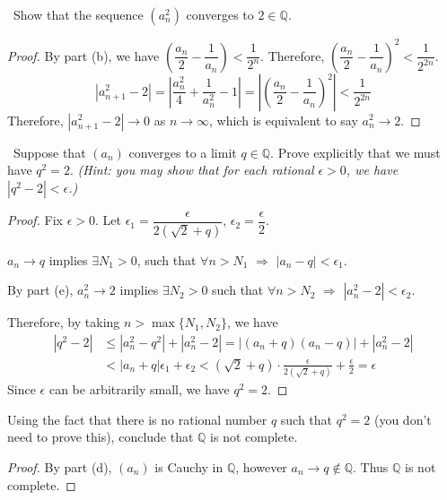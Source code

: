 \documentclass[12pt,a4paper]{amsart}
\newcommand{\bbQ}{\mathbb{Q}}
\newcommand{\turnin}{\faPencilSquareO}
\begin{document}
\begin{compactenum}[(a)]
\item \turnin\ Show that the sequence $(a_n^2)$ converges to $2 \in \bbQ$.

\begin{proof}
By part (b), we have $\left(\dfrac{a_n}{2} - \dfrac{1}{a_n}\right) < \dfrac{1}{2^n}$.
Therefore, $\left(\dfrac{a_n}{2} - \dfrac{1}{a_n}\right)^2 < \dfrac{1}{2^{2n}}$.
$$ |a_{n+1}^2 - 2| = \left\rvert \frac{a_n^2}{4} +\frac{1}{a_n^2} - 1 \right\rvert
     = \left\rvert \left(\dfrac{a_n}{2} - \dfrac{1}{a_n}\right)^2 \right\rvert
     < \frac{1}{2^{2n}}
$$
Therefore, $|a_{n+1}^2 - 2|\to 0$ as $n\to\infty$, which is equivalent to say $a_n^2 \to 2$.
\end{proof}

\item \turnin\ Suppose that $(a_n)$ converges to a limit $q \in \bbQ$.
  Prove explicitly that we must have $q^2 = 2$.
  \emph{(Hint: you may show that for each rational $\epsilon > 0$, we have $|q^2-2| < \epsilon$.)}

\begin{proof}
\setlength{\parskip}{0.5em}
Fix $\epsilon > 0$. Let $\epsilon_1 = \dfrac{\epsilon}{2(\sqrt{2}+q)}$, $\epsilon_2 = \dfrac{\epsilon}{2}$.

\begin{compactenum}[(i)]
  \setlength{\itemsep}{0.5em}
  \item $a_n \to q$ implies $\exists N_1 > 0$, such that
        $\forall n>N_1$ $\Rightarrow$ $|a_n - q| < \epsilon_1$.
  \item By part (e), $a_n^2 \to 2$ implies $\exists N_2 > 0$ such that
        $\forall n>N_2$ $\Rightarrow$ $|a_n^2 - 2| < \epsilon_2$.
\end{compactenum}
\noindent
Therefore, by taking $n>\max\{ N_1, N_2\}$, we have
\begin{align*}
|q^2 - 2| &\le |a_n^2 - q^2| + |a_n^2 - 2| = |(a_n+q)(a_n - q)| + |a_n^2 - 2|  \\
 &< |a_n+q|\epsilon_1 + \epsilon_2
  <(\sqrt{2} + q)\cdot \frac{\epsilon}{2(\sqrt{2}+q)} + \frac{\epsilon}{2}
  = \epsilon
\end{align*}
Since $\epsilon$ can be arbitrarily small, we have $q^2=2$.
\end{proof}

\item Using the fact that there is no rational number $q$ such that $q^2 = 2$ (you don't need to prove this), conclude that $\bbQ$ is not complete.

\begin{proof}
By part (d), $(a_n)$ is Cauchy in $\bbQ$, however $a_n \to q \notin\bbQ$. Thus $\bbQ$ is not complete.
\end{proof}

\end{compactenum}
\end{document}
